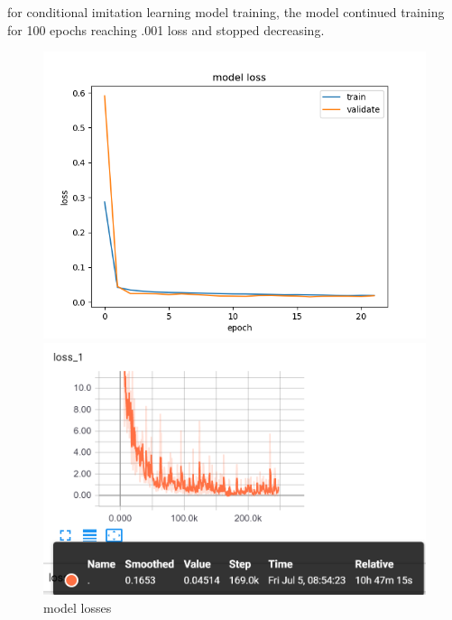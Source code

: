 for conditional imitation learning model training, the model continued training for 100 epochs reaching .001 loss and stopped decreasing.
 \begin{figure}%
 \begin{minipage}[t]{.3\linewidth}
    \center
    \includegraphics[width=1\textwidth]{images/Learningprocess/lossGraph.png}%

    \end{minipage}
    \begin{minipage}[t]{.5\linewidth}
    \includegraphics[width=1\textwidth]{images/Learningprocess/carla-valid.png}%
\caption[model losses]{ model losses}\label{fig:  model losses}%
    \end{minipage}
    
      \end{figure}
